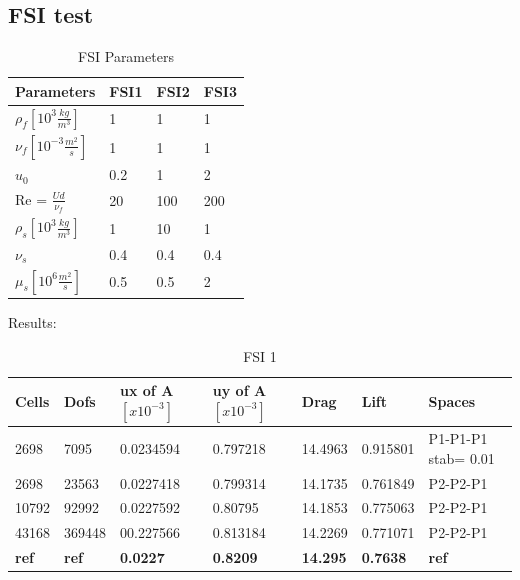 \subsection*{FSI test}
\begin{table}[ht]
\centering
\caption{FSI Parameters}
\label{my-label}
\begin{tabular}{|l|l|l|l|}
\hline
Parameters & FSI1 & FSI2 & FSI3 \\ \hline
$\rho_f[10^3 \frac{kg}{m^3}]$ & 1 & 1 & 1 \\ \hline
$\nu_f [10^{-3} \frac{m^2}{s}]$ & 1 & 1 & 1 \\ \hline
$u_0$ & 0.2 & 1 & 2 \\ \hline
Re = $\frac{U d}{\nu_f}$ & 20 & 100 & 200 \\ \hline
$\rho_s[10^3 \frac{kg}{m^3}]$ & 1 & 10 & 1 \\ \hline
$\nu_s$ & 0.4 & 0.4 & 0.4 \\ \hline
$\mu_s[10^6 \frac{m^2}{s}]$ & 0.5 & 0.5 & 2 \\ \hline
\end{tabular}
\end{table}
Results: 
\begin{table}[h]
\centering
\caption{FSI 1}
\label{my-label}
\begin{tabular}{|l|l|l|l|l|l|l|}
\hline
Cells & Dofs & ux of A $[x10^{-3}]$ & uy of A $[x10^{-3}]$ & Drag & Lift & Spaces \\ \hline
2698 & 7095 & 0.0234594 & 0.797218  & 14.4963 & 0.915801 & P1-P1-P1 stab= 0.01 \\ \hline
2698 & 23563 &0.0227418 &0.799314  &  14.1735 &0.761849 & P2-P2-P1 \\ \hline
10792 & 92992  &0.0227592 & 0.80795 & 14.1853 &  0.775063 &  P2-P2-P1 \\ \hline
43168 & 369448 & 00.227566 & 0.813184 & 14.2269 & 0.771071 & P2-P2-P1 \\ \hline
\textbf{ref} & \textbf{ref} & \textbf{0.0227} & \textbf{0.8209} & \textbf{14.295} & \textbf{0.7638} & \textbf{ref} \\ \hline
\end{tabular}
\end{table}



